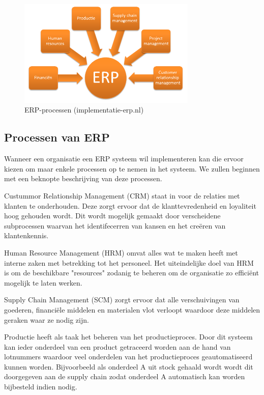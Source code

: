 \documentclass{hogent-article}
\begin{document}
\begin{figure}[h!]
    \includegraphics[width=8.5cm]{img/processen.png}
    \caption{ERP-processen (implementatie-erp.nl)}
\end{figure}


\subsection{Processen van ERP}
Wanneer een organisatie een ERP systeem wil implementeren kan die ervoor kiezen om maar enkele processen op te nemen in het systeem. We zullen beginnen met een beknopte beschrijving van deze processen. \par

Custummor Relationship Management (CRM) staat in voor de relaties met klanten te onderhouden. Deze zorgt ervoor dat de klanttevredenheid en loyaliteit hoog gehouden wordt. Dit wordt mogelijk gemaakt door verscheidene subprocessen waarvan het identifecerren van kansen en het creëren van klantenkennis. \autocite{Rababah2011} \par

Human Resource Management (HRM) omvat alles wat te maken heeft met interne zaken met betrekking tot het personeel. Het uiteindelijke doel van HRM is om de beschikbare "resources" zodanig te beheren om de organisatie zo efficiënt mogelijk te laten werken. \autocite{Greenwood2002} \par

Supply Chain Management (SCM) zorgt ervoor dat alle verschuivingen van goederen, financiële middelen en materialen vlot verloopt waardoor deze middelen geraken waar ze nodig zijn. \autocite{Oracle2022} \par

Productie heeft als taak het beheren van het productieproces. Door dit systeem kan ieder onderdeel van een product getraceerd worden aan de hand van lotnummers waardoor veel onderdelen van het productieproces geautomatiseerd kunnen worden. Bijvoorbeeld als onderdeel A uit stock gehaald wordt wordt dit doorgegeven aan de supply chain zodat onderdeel A automatisch kan worden bijbesteld indien nodig. \autocite{Captivea2022} \par
\end{document}
